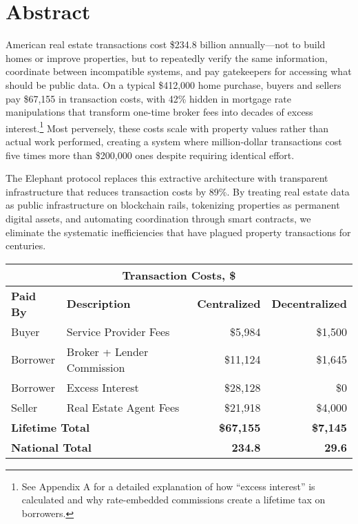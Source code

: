 \chapter{Abstract}

American real estate transactions cost \$234.8 billion annually---not to build homes or improve properties, but to repeatedly verify the same information, coordinate between incompatible systems, and pay gatekeepers for accessing what should be public data. On a typical \$412,000 home purchase, buyers and sellers pay \$67,155 in transaction costs, with 42\% hidden in mortgage rate manipulations that transform one-time broker fees into decades of excess interest.\footnote{See Appendix A for a detailed explanation of how ``excess interest'' is calculated and why rate-embedded commissions create a lifetime tax on borrowers.} Most perversely, these costs scale with property values rather than actual work performed, creating a system where million-dollar transactions cost five times more than \$200,000 ones despite requiring identical effort.

The Elephant protocol replaces this extractive architecture with transparent infrastructure that reduces transaction costs by 89\%. By treating real estate data as public infrastructure on blockchain rails, tokenizing properties as permanent digital assets, and automating coordination through smart contracts, we eliminate the systematic inefficiencies that have plagued property transactions for centuries.

\begin{center}
\begin{tabular}{l|l|r|r}
\multicolumn{4}{c}{\textbf{Transaction Costs, \$}} \\
\hline
\textbf{Paid By} & \textbf{Description} & \textbf{Centralized} & \textbf{Decentralized} \\
\hline
Buyer & Service Provider Fees & \$5,984 & \$1,500 \\
Borrower & Broker + Lender Commission & \$11,124 & \$1,645 \\
Borrower & Excess Interest & \$28,128 & \$0 \\
Seller & Real Estate Agent Fees & \$21,918 & \$4,000 \\
\hline
\multicolumn{2}{l|}{\textbf{Lifetime Total}} & \textbf{\$67,155} & \textbf{\$7,145} \\
\hline
\multicolumn{2}{l|}{\textbf{National Total}} & \textbf{234.8} & \textbf{29.6} \\
\end{tabular}
\end{center}

